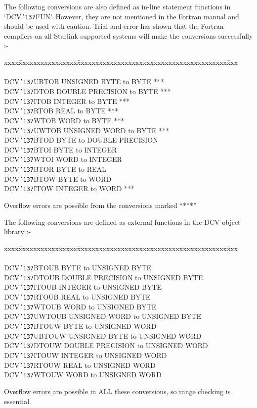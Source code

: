 \documentclass[twoside,11pt]{article}
\renewcommand{\_}{{\tt\char'137}}     %
\begin{document}
\newpage

The following conversions are also defined as in-line statement functions in
`DCV\_FUN'. However, they are not mentioned in the Fortran manual and should be
used with caution. Trial and error has shown that the Fortran compliers on all
Starlink supported systems will make the conversions successfully :-

\begin{tabbing}
xxxx\=xxxxxxxxxxxxxxxx\=xxxxxxxxxxxxxxxxxxxxxxxxxxxxxxxxxxxxxxxxx\=xxx\kill 
{}      \\
\\
\>DCV\_UBTOB \>UNSIGNED BYTE to BYTE          \>*** \\
\>DCV\_DTOB  \>DOUBLE PRECISION to BYTE       \>*** \\
\>DCV\_ITOB  \>INTEGER to BYTE                \>*** \\
\>DCV\_RTOB  \>REAL to BYTE                   \>*** \\
\>DCV\_WTOB  \>WORD to BYTE                   \>*** \\
\>DCV\_UWTOB \>UNSIGNED WORD to BYTE          \>*** \\
\>DCV\_BTOD  \>BYTE to DOUBLE PRECISION \\
\>DCV\_BTOI  \>BYTE to INTEGER \\
\>DCV\_WTOI  \>WORD to INTEGER \\
\>DCV\_BTOR  \>BYTE to REAL \\
\>DCV\_BTOW  \>BYTE to WORD \\
\>DCV\_ITOW  \>INTEGER to WORD                \>*** \\
\end{tabbing}
Overflow errors are possible from the conversions marked ``***''

The following conversions are defined as external
functions in the DCV object library :-
\begin{tabbing}
xxxx\=xxxxxxxxxxxxxxxx\=xxxxxxxxxxxxxxxxxxxxxxxxxxxxxxxxxxxxxxxxx\=xxx\kill 
{}     \\
\\
\>DCV\_BTOUB  \>BYTE to UNSIGNED BYTE \\
\>DCV\_DTOUB  \>DOUBLE PRECISION to UNSIGNED BYTE \\
\>DCV\_ITOUB  \>INTEGER to UNSIGNED BYTE \\
\>DCV\_RTOUB  \>REAL to UNSIGNED BYTE \\
\>DCV\_WTOUB  \>WORD to UNSIGNED BYTE \\
\>DCV\_UWTOUB \>UNSIGNED WORD to UNSIGNED BYTE \\
\>DCV\_BTOUW  \>BYTE to UNSIGNED WORD \\
\>DCV\_UBTOUW \>UNSIGNED BYTE to UNSIGNED WORD \\
\>DCV\_DTOUW  \>DOUBLE PRECISION to UNSIGNED WORD \\
\>DCV\_ITOUW  \>INTEGER to UNSIGNED WORD \\
\>DCV\_RTOUW  \>REAL to UNSIGNED WORD \\
\>DCV\_WTOUW  \>WORD to UNSIGNED WORD \\
\end{tabbing} 
Overflow errors are possible in ALL these conversions, so range checking is 
essential.
\end{document}
